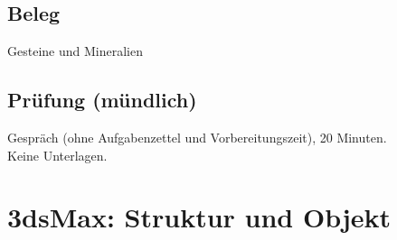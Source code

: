 \newcommand{\customDir}{../}








%




\maketitle
\newpage
\tableofcontents
\newpage


\section*{Beleg}
Gesteine und Mineralien

\section*{Prüfung (mündlich)}
Gespräch (ohne Aufgabenzettel und Vorbereitungszeit), 20 Minuten.\\
Keine Unterlagen.

\chapter{3dsMax: Struktur und Objekt}





